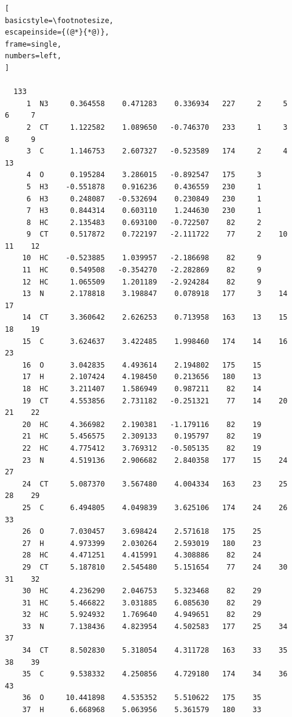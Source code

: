 \documentclass[a4paper,11pt]{scrartcl}
\begin{document}
\begin{lstlisting}[
basicstyle=\footnotesize,
escapeinside={(@*}{*@)},
frame=single,
numbers=left,
]

  133
     1  N3     0.364558    0.471283    0.336934   227     2     5     6     7
     2  CT     1.122582    1.089650   -0.746370   233     1     3     8     9
     3  C      1.146753    2.607327   -0.523589   174     2     4    13
     4  O      0.195284    3.286015   -0.892547   175     3
     5  H3    -0.551878    0.916236    0.436559   230     1
     6  H3     0.248087   -0.532694    0.230849   230     1
     7  H3     0.844314    0.603110    1.244630   230     1
     8  HC     2.135483    0.693100   -0.722507    82     2
     9  CT     0.517872    0.722197   -2.111722    77     2    10    11    12
    10  HC    -0.523885    1.039957   -2.186698    82     9
    11  HC     0.549508   -0.354270   -2.282869    82     9
    12  HC     1.065509    1.201189   -2.924284    82     9
    13  N      2.178818    3.198847    0.078918   177     3    14    17
    14  CT     3.360642    2.626253    0.713958   163    13    15    18    19
    15  C      3.624637    3.422485    1.998460   174    14    16    23
    16  O      3.042835    4.493614    2.194802   175    15
    17  H      2.107424    4.198450    0.213656   180    13
    18  HC     3.211407    1.586949    0.987211    82    14
    19  CT     4.553856    2.731182   -0.251321    77    14    20    21    22
    20  HC     4.366982    2.190381   -1.179116    82    19
    21  HC     5.456575    2.309133    0.195797    82    19
    22  HC     4.775412    3.769312   -0.505135    82    19
    23  N      4.519136    2.906682    2.840358   177    15    24    27
    24  CT     5.087370    3.567480    4.004334   163    23    25    28    29
    25  C      6.494805    4.049839    3.625106   174    24    26    33
    26  O      7.030457    3.698424    2.571618   175    25
    27  H      4.973399    2.030264    2.593019   180    23
    28  HC     4.471251    4.415991    4.308886    82    24
    29  CT     5.187810    2.545480    5.151654    77    24    30    31    32
    30  HC     4.236290    2.046753    5.323468    82    29
    31  HC     5.466822    3.031885    6.085630    82    29
    32  HC     5.924932    1.769640    4.949651    82    29
    33  N      7.138436    4.823954    4.502583   177    25    34    37
    34  CT     8.502830    5.318054    4.311728   163    33    35    38    39
    35  C      9.538332    4.250856    4.729180   174    34    36    43
    36  O     10.441898    4.535352    5.510622   175    35
    37  H      6.668968    5.063956    5.361579   180    33

\end{lstlisting}
\end{document}
